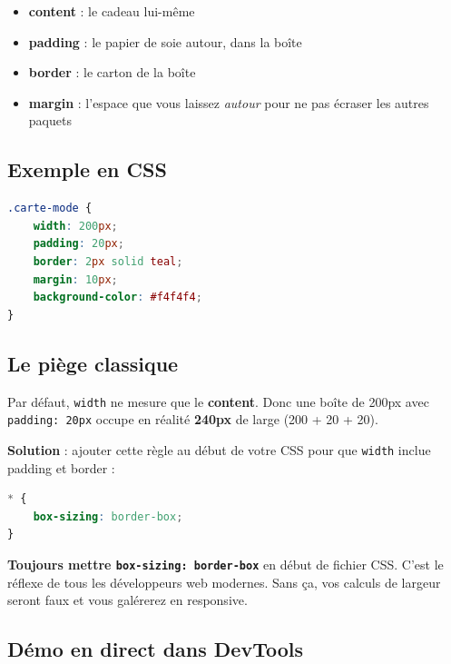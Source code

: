 \documentclass[11pt,a4paper]{article}
\begin{document}
\begin{infobox}
\begin{itemize}[nosep]
    \item \textbf{content} : le cadeau lui-même
    \item \textbf{padding} : le papier de soie autour, dans la boîte
    \item \textbf{border} : le carton de la boîte
    \item \textbf{margin} : l'espace que vous laissez \emph{autour} pour ne pas écraser les autres paquets
\end{itemize}
\end{infobox}

\subsection{Exemple en CSS}

\begin{lstlisting}[language=CSS]
.carte-mode {
    width: 200px;
    padding: 20px;
    border: 2px solid teal;
    margin: 10px;
    background-color: #f4f4f4;
}
\end{lstlisting}

\subsection{Le piège classique}

Par défaut, \texttt{width} ne mesure que le \textbf{content}. Donc une boîte
de 200px avec \texttt{padding: 20px} occupe en réalité \textbf{240px} de
large (200 + 20 + 20).

\textbf{Solution} : ajouter cette règle au début de votre CSS pour que
\texttt{width} inclue padding et border :

\begin{lstlisting}[language=CSS]
* {
    box-sizing: border-box;
}
\end{lstlisting}

\begin{retenirbox}
\textbf{Toujours mettre \texttt{box-sizing: border-box}} en début de
fichier CSS. C'est le réflexe de tous les développeurs web modernes. Sans
ça, vos calculs de largeur seront faux et vous galérerez en responsive.
\end{retenirbox}

\subsection{Démo en direct dans DevTools}
\end{document}
